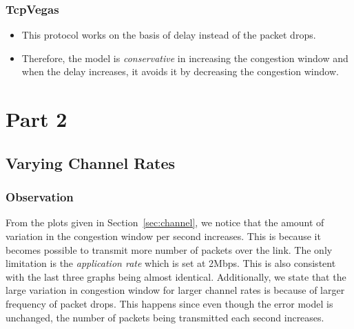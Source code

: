 \documentclass[11pt]{article}
\begin{document}
\subsubsection{TcpVegas}
\begin{itemize}
  \item This protocol works on the basis of delay instead of the packet drops.
  \item Therefore, the model is \textit{conservative} in increasing the congestion window and when the delay increases, it avoids it by decreasing the congestion window.
\end{itemize}


\section{Part 2}

\subsection{Varying Channel Rates}
\subsubsection{Observation}
From the plots given in Section~\ref{sec:channel}, we notice that the amount of variation in the congestion window per second increases. This is because it becomes possible to transmit more number of packets over the link. The only limitation is the \textit{application rate} which is set at 2Mbps. This is also consistent with the last three graphs being almost identical. Additionally, we state that the large variation in congestion window for larger channel rates is because of larger frequency of packet drops. This happens since even though the error model is unchanged, the number of packets being transmitted each second increases.
\end{document}
